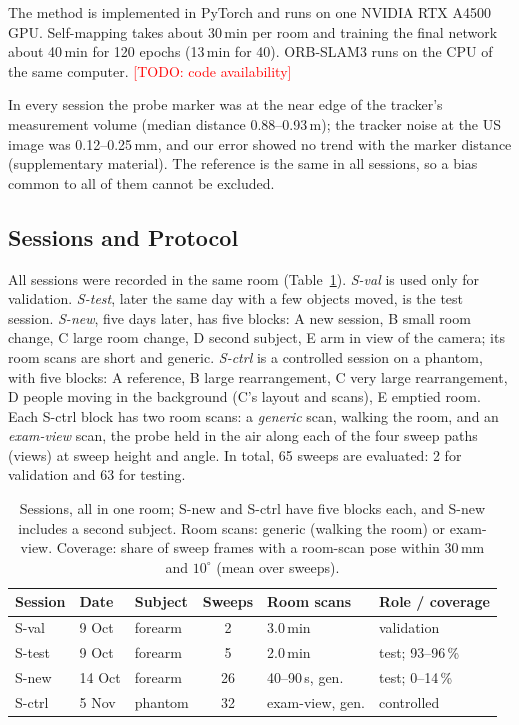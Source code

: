 \documentclass[9pt,shortpaper,twoside,web]{ieeecolor2}
\newcommand{\tbd}[1]{\textcolor{red}{[TODO: #1]}}
\newcommand{\Sval}{S-val}
\newcommand{\Stest}{S-test}
\newcommand{\Snew}{S-new}
\newcommand{\Sctrl}{S-ctrl}
\begin{document}
The method is implemented in PyTorch and runs on one NVIDIA RTX A4500 GPU. Self-mapping takes about 30\,min per room and training the final network about 40\,min for 120 epochs (13\,min for 40). ORB-SLAM3 runs on the CPU of the same computer. \tbd{code availability}

In every session the probe marker was at the near edge of the tracker's measurement volume (median distance 0.88--0.93\,m); the tracker noise at the US image was 0.12--0.25\,mm, and our error showed no trend with the marker distance (supplementary material). The reference is the same in all sessions, so a bias common to all of them cannot be excluded.

\subsection{Sessions and Protocol}
\label{sec:sessions}\label{sec:rules}
All sessions were recorded in the same room (Table~\ref{tab:sessions}). \emph{\Sval{}} is used only for validation. \emph{\Stest{}}, later the same day with a few objects moved, is the test session. \emph{\Snew{}}, five days later, has five blocks: A new session, B small room change, C large room change, D second subject, E arm in view of the camera; its room scans are short and generic. \emph{\Sctrl{}} is a controlled session on a phantom, with five blocks: A reference, B large rearrangement, C very large rearrangement, D people moving in the background (C's layout and scans), E emptied room. Each \Sctrl{} block has two room scans: a \emph{generic} scan, walking the room, and an \emph{exam-view} scan, the probe held in the air along each of the four sweep paths (views) at sweep height and angle. In total, 65 sweeps are evaluated: 2 for validation and 63 for testing.

\begin{table}[t]
  \caption{Sessions, all in one room; \Snew{} and \Sctrl{} have five blocks each, and \Snew{} includes a second subject. Room scans: generic (walking the room) or exam-view. Coverage: share of sweep frames with a room-scan pose within 30\,mm and $10^\circ$ (mean over sweeps).}
  \label{tab:sessions}
  \centering
  \scriptsize
  \setlength{\tabcolsep}{2pt}
  \begin{tabular}{@{}lllcll@{}}
    \toprule
    Session & Date & Subject & Sweeps & Room scans & Role / coverage\\
    \midrule
    \Sval & 9 Oct & forearm & 2 & 3.0\,min & validation\\
    \Stest & 9 Oct & forearm & 5 & 2.0\,min & test; 93--96\,\%\\
    \Snew & 14 Oct & forearm & 26 & 40--90\,s, gen. & test; 0--14\,\%\\
    \Sctrl & 5 Nov & phantom & 32 & exam-view, gen. & controlled\\
    \bottomrule
  \end{tabular}
\end{table}
\end{document}
